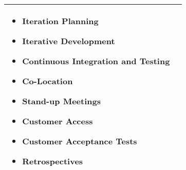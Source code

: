 \begin{tabular}{| p{7.5cm} | p{7cm} |}
\begin{itemize}
 			\item {\color{RoyalBlue1}Iteration Planning} 
 			\item {\color{DarkMagenta}Iterative Development} 
 			\item {\color{DarkOrange1}Continuous Integration and Testing} 
 			\item {\color{DeepPink1}Co-Location} 
 			\item {\color{green4}Stand-up Meetings} 
 			\item {\color{DarkBlue}Customer Access} 
 			\item {\color{red2}Customer Acceptance Tests} 
 			\item {\color{DarkRed}Retrospectives} 
 		\end{itemize}
     \\ \hline
\end{tabular}
\label{table:opp_pam_practices}

